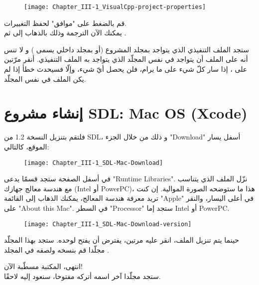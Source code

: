\begin{figure}[H]
	\centering
	\texttt{[image: Chapter\_III-1\_VisualCpp-project-properties]}
\end{figure}


قم بالضغط على "موافق" لحفظ التغييرات.\\
يمكنك الآن الترجمة وذلك بالذهاب إلى
ثم
.

ستجد الملف التنفيذي الذي يتواجد بمجلد المشروع (أو بمجلد داخلي يسمى
)
و لا تنس أنه على الملف
أن يتواجد في نفس المجلّد الذي يتواجد به الملف التنفيذي. أنقر مرّتين على
،
 إذا سار كلّ شيء على ما يرام، فلن يحصل أيّ شيء، وإلّا فسيحدث خطأ إذا لم يكن الملف
في نفس المجلّد.

\section{إنشاء مشروع \textenglish{SDL}: \textenglish{Mac OS} (\textenglish{Xcode})}

فلتقم بتنزيل النسخة 1.2 من \textenglish{SDL}،
و ذلك من خلال الجزء
"\textenglish{Download}"
أسفل يسار الموقع، كالتالي:

\begin{figure}[H]
	\centering
	\texttt{[image: Chapter\_III-1\_SDL-Mac-Download]}
\end{figure}

في أسفل الصفحة ستجد قسمًا يدعى 
"\textenglish{Runtime Libraries}".
نزّل الملف الذي يتناسب مع هندسة معالج جهازك
(\textenglish{Intel} أو \textenglish{PowerPC})،
 هذا ما ستوضحه الصورة الموالية. إن كنت تريد معرفة هندسة المعالج، يمكنك الذهاب إلى القائمة 
"\textenglish{Apple}"
في أعلى اليسار، والنقر على 
"\textenglish{About this Mac}".
في السطر 
"\textenglish{Processor}"
ستجد إما
\textenglish{Intel} أو \textenglish{PowerPC}.

\begin{figure}[H]
	\centering
	\texttt{[image: Chapter\_III-1\_SDL-Mac-Download-version]}
\end{figure}

حينما يتم تنزيل الملف، انقر عليه مرتين، يفترض أن يفتح لوحده. ستجد بهذا المجلّد مجلّدا
قم بنسخه ولصقه في المجلد 
.

انتهى، المكتبة مسطّبة الآن!\\
ستجد مجلّدا آخر اسمه 
أتركه مفتوحا، سنعود إليه لاحقًا.

